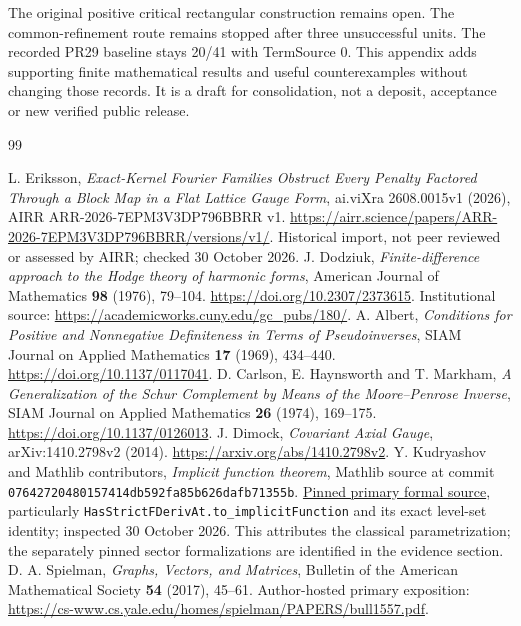 \documentclass[11pt]{article}
\begin{document}
The original positive critical rectangular construction remains open.
The common-refinement route remains stopped after three unsuccessful units.
The recorded PR29 baseline stays 20/41 with TermSource 0. This appendix adds
supporting finite mathematical results and useful counterexamples without
changing those records. It is a draft for consolidation, not a deposit,
acceptance or new verified public release.


\begin{thebibliography}{99}
\small
\raggedright
{} L. Eriksson, \emph{Exact-Kernel Fourier Families Obstruct
Every Penalty Factored Through a Block Map in a Flat Lattice Gauge Form},
ai.viXra 2608.0015v1 (2026), AIRR ARR-2026-7EPM3V3DP796BBRR v1.
\url{https://airr.science/papers/ARR-2026-7EPM3V3DP796BBRR/versions/v1/}.
Historical import, not peer reviewed or assessed by AIRR; checked 30 October 2026.
 J. Dodziuk, \emph{Finite-difference approach to the Hodge
theory of harmonic forms}, American Journal of Mathematics \textbf{98}
(1976), 79--104. \url{https://doi.org/10.2307/2373615}.
Institutional source: \url{https://academicworks.cuny.edu/gc_pubs/180/}.
 A. Albert, \emph{Conditions for Positive and Nonnegative
Definiteness in Terms of Pseudoinverses}, SIAM Journal on Applied Mathematics
\textbf{17} (1969), 434--440. \url{https://doi.org/10.1137/0117041}.
 D. Carlson, E. Haynsworth and T. Markham,
\emph{A Generalization of the Schur Complement by Means of the Moore--Penrose
Inverse}, SIAM Journal on Applied Mathematics \textbf{26} (1974), 169--175.
\url{https://doi.org/10.1137/0126013}.
 J. Dimock, \emph{Covariant Axial Gauge},
arXiv:1410.2798v2 (2014). \url{https://arxiv.org/abs/1410.2798v2}.
 Y. Kudryashov and Mathlib contributors,
\emph{Implicit function theorem}, Mathlib source at commit
\texttt{07642720480157414db592fa85b626dafb71355b}.
\href{https://github.com/leanprover-community/mathlib4/blob/07642720480157414db592fa85b626dafb71355b/Mathlib/Analysis/Calculus/Implicit.lean}{Pinned primary formal source},
particularly \texttt{HasStrictFDerivAt.to\_implicitFunction} and its exact
level-set identity; inspected 30 October 2026. This attributes the classical parametrization; the separately pinned sector formalizations are identified in the evidence section.
 D. A. Spielman, \emph{Graphs, Vectors, and Matrices},
Bulletin of the American Mathematical Society \textbf{54} (2017), 45--61.
Author-hosted primary exposition:
\url{https://cs-www.cs.yale.edu/homes/spielman/PAPERS/bull1557.pdf}.

\end{thebibliography}
\end{document}
